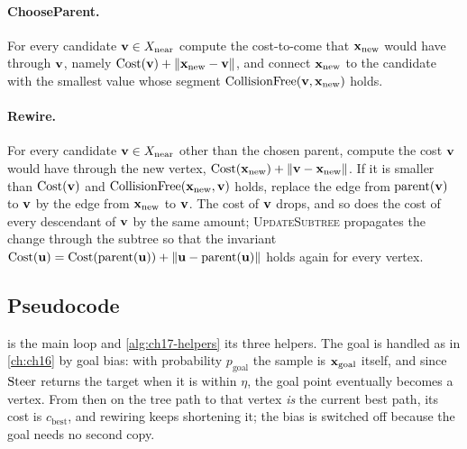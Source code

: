 \paragraph{ChooseParent.} For every candidate $\mathbf{v}\in X_{\mathrm{near}}$
compute the cost-to-come that $\mathbf{x}_{\mathrm{new}}$ would have through $\mathbf{v}$,
namely $\mathrm{Cost}(\mathbf{v})+\left\lVert \mathbf{x}_{\mathrm{new}}-\mathbf{v} \right\rVert$, and connect
$\mathbf{x}_{\mathrm{new}}$ to the candidate with the smallest value whose segment
$\operatorname{CollisionFree}(\mathbf{v},\mathbf{x}_{\mathrm{new}})$ holds. 

\paragraph{Rewire.} For every candidate $\mathbf{v}\in X_{\mathrm{near}}$ other than
the chosen parent, compute the cost $\mathbf{v}$ would have through the new vertex,
$\mathrm{Cost}(\mathbf{x}_{\mathrm{new}})+\left\lVert \mathbf{v}-\mathbf{x}_{\mathrm{new}} \right\rVert$. If it is smaller
than $\mathrm{Cost}(\mathbf{v})$ and $\operatorname{CollisionFree}(\mathbf{x}_{\mathrm{new}},\mathbf{v})$ holds,
replace the edge from $\mathrm{parent}(\mathbf{v})$ to $\mathbf{v}$ by the edge from
$\mathbf{x}_{\mathrm{new}}$ to $\mathbf{v}$. The cost of $\mathbf{v}$ drops, and so does the cost of
every descendant of $\mathbf{v}$ by the same amount; \textsc{UpdateSubtree}
propagates the change through the subtree so that the invariant
$\mathrm{Cost}(\mathbf{u})=\mathrm{Cost}(\mathrm{parent}(\mathbf{u}))+\left\lVert \mathbf{u}-\mathrm{parent}(\mathbf{u}) \right\rVert$
holds again for every vertex.

\subsection{Pseudocode}
\label{sec:ch17-pseudocode}

 is the main loop and \cref{alg:ch17-helpers} its
three helpers. The goal is handled as in \cref{ch:ch16} by goal
bias: with probability $p_{\mathrm{goal}}$ the sample is
$\mathbf{x}_{\mathrm{goal}}$ itself, and since $\operatorname{Steer}$ returns the target when it is
within $\eta$, the goal point eventually becomes a vertex. From then on the
tree path to that vertex \emph{is} the current best path, its cost is
$c_{\mathrm{best}}$, and rewiring keeps shortening it; the bias is switched
off because the goal needs no second copy.

